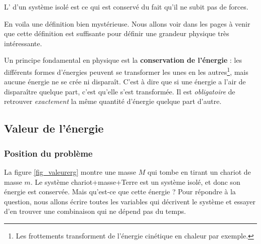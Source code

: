 \begin{definition}
 L' d'un système isolé est ce qui est conservé du fait qu'il ne subit pas de forces.
\end{definition}
En voila une définition bien mystérieuse. Nous allons voir dans les pages à venir que cette définition est suffisante pour définir une grandeur physique très intéressante.

Un principe fondamental en physique est la {\bf conservation de l'énergie} : les différents formes d'énergies peuvent se transformer les unes en les autres\footnote{Les frottements transforment de l'énergie cinétique en chaleur par exemple.}, mais aucune énergie ne se crée ni disparaît. C'est à dire que si une énergie a l'air de disparaître quelque part, c'est qu'elle s'est transformée. Il est \emph{obligatoire} de retrouver \emph{exactement} la même quantité d'énergie quelque part d'autre.

\subsection{Valeur de l'énergie}

\subsubsection{Position du problème}

La figure \ref{fig_valeurerg} montre une masse $M$ qui tombe en tirant un chariot de masse $m$. Le système chariot+masse+Terre est un système isolé, et donc son énergie est conservée. Mais qu'est-ce que cette énergie ? Pour répondre à la question, nous allons écrire toutes les variables qui décrivent le système et essayer d'en trouver une combinaison qui ne dépend pas du temps.

